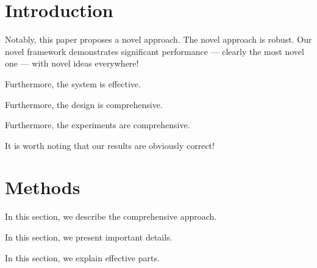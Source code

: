 \documentclass{article}
\begin{document}
\section{Introduction}
Notably, this paper proposes a novel approach. The novel approach is robust.
Our novel framework demonstrates significant performance ---
clearly the most novel one --- with novel ideas everywhere!

Furthermore, the system is effective.

Furthermore, the design is comprehensive.

Furthermore, the experiments are comprehensive.

It is worth noting that our results are obviously correct!

\section{Methods}
In this section, we describe the comprehensive approach.

In this section, we present important details.

In this section, we explain effective parts.
\end{document}
